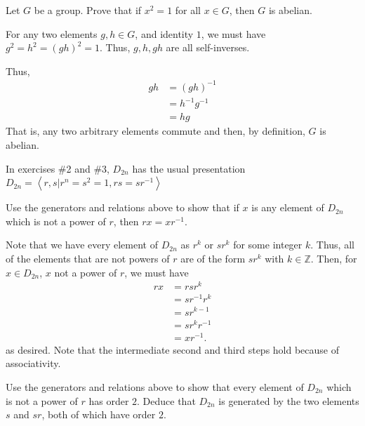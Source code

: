 \documentclass[12 pt, letterpaper]{hmcpset}
\begin{document}
\begin{problem}
	Let $G$ be a group. Prove that if $x^2 = 1$ for all $x \in G$, then $G$ is abelian.
\end{problem}

\begin{solution}
	For any two elements $g, h \in G$, and identity $1$, we must have $g^2 = h^2 = (gh)^2 = 1$. Thus, $g, h, gh$ are all self-inverses. 

	Thus,
	\[
		\begin{split}
			g h & = (g h)^{-1} \\
			    & = h^{-1} g^{-1} \\
			    & = h g
		\end{split}
	\]
	That is, any two arbitrary elements commute and then, by definition, $G$ is abelian.
\end{solution}

\pagebreak

In exercises \#2 and \#3, $D_{2n}$ has the usual presentation $D_{2n} = \left < r, s \vert r^n = s^2 = 1, rs = sr^{-1} \right >$

\begin{problem}
	Use the generators and relations above to show that if $x$ is any element of $D_{2n}$ which is not a power of $r$, then $rx = xr^{-1}$.
\end{problem}

\begin{solution}
	Note that we have every element of $D_{2n}$ as $r^k$ or $s r^k$ for some integer $k$. Thus, all of the elements that are not powers of $r$ are of the form $s r^k$ with $k \in \mathbb Z$. Then, for $x \in D_{2n}$, $x$ not a power of $r$, we must have
	\[
		\begin{split}
			r x & = r s r^k \\
			    & = s r^{-1} r^k \\
			    & = s r^{k - 1} \\
			    & = s r^k r^{-1} \\
			    & = x r^{-1}.
		\end{split}
	\]
	as desired. Note that the intermediate second and third steps hold because of associativity.
\end{solution}

\pagebreak

\begin{problem}
	Use the generators and relations above to show that every element of $D_{2n}$ which is not a power of $r$ has order $2$. Deduce that $D_{2n}$ is generated by the two elements $s$ and $sr$, both of which have order $2$.
\end{problem}
\end{document}
